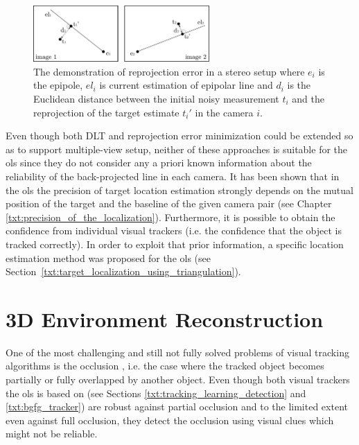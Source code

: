 \begin{figure}[tbh]
	\centering
	\includegraphics[width=0.6\textwidth]{fig/reprojection.pdf}
	\caption{The demonstration of reprojection error in a stereo setup where $e_{i}$ is the epipole, $el_{i}$ is current estimation of epipolar line and $d_{i}$ is the Euclidean distance between the initial noisy measurement $t_{i}$ and the reprojection of the target estimate $t_{i}'$ in the camera $i$.}
	\label{fig:reprojection}
\end{figure}

Even though both DLT and reprojection error minimization could be extended so as to support multiple-view setup, neither of these approaches is suitable for the \gls{ols} since they do not consider any a priori known information about the reliability of the back-projected line in each camera. It has been shown that in the \gls{ols} the precision of target location estimation strongly depends on the mutual position of the target and the baseline of the given camera pair (see Chapter \ref{txt:precision_of_the_localization}). Furthermore, it is possible to obtain the confidence from individual visual trackers (i.e. the confidence that the object is tracked correctly). In order to exploit that prior information, a specific location estimation method was proposed for the \gls{ols} (see Section~\ref{txt:target_localization_using_triangulation}).

\section{3D Environment Reconstruction} \label{txt:3d_environment_reconstruction}

One of the most challenging and still not fully solved problems of visual tracking algorithms is the occlusion \cite{Zhang:2010:RVT:1937728.1937766, conf/iccv/KwakNHH11}, i.e. the case where the tracked object becomes partially or fully overlapped by another object. Even though both visual trackers the \gls{ols} is based on (see Sections \ref{txt:tracking_learning_detection} and \ref{txt:bgfg_tracker}) are robust against partial occlusion and to the limited extent even against full occlusion, they detect the occlusion using visual clues which might not be reliable. 

